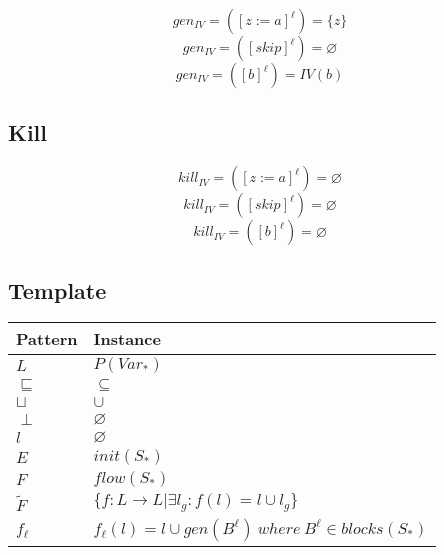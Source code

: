 \documentclass[11pt,a4paper,fleqn]{article}
\begin{document}
   \begin{equation}
      gen_{IV}=([z:=a]^{\ell})=\{z\}
   \end{equation}
   \begin{equation}
      gen_{IV}=([skip]^{\ell})=\varnothing
   \end{equation}
   \begin{equation}
      gen_{IV}=([b]^{\ell})=IV(b)
   \end{equation}

   \subsection{Kill}

   \begin{equation}
      kill_{IV}=([z:=a]^{\ell})=\varnothing
   \end{equation}
   \begin{equation}
      kill_{IV}=([skip]^{\ell})=\varnothing
   \end{equation}
   \begin{equation}
      kill_{IV}=([b]^{\ell})=\varnothing
   \end{equation}

   \subsection{Template}

   \begin{tabularx}{\linewidth}{| l | X |}
      \hline
      \textbf{Pattern} & \textbf{Instance} \\
      \hline\hline
      \( L \)  & \( P(Var_*) \) \\
      \hline
      \( \sqsubseteq \)  & \( \subseteq \) \\
      \hline
      \( \sqcup \)  & \( \cup \) \\
      \hline
      \( \perp \)  & \( \varnothing \) \\
      \hline
      \( l \)  & \( \varnothing \) \\
      \hline
      \( E \)  & \( init(S_*) \) \\
      \hline
      \( F \)  & \( flow(S_*) \) \\
      \hline
      \( \tilde{F} \)  & \( \{f : L \rightarrow L | \exists l_g : f(l) = l \cup l_g \} \) \\
      \hline
      \( f_{\ell} \)  & \( f_{\ell}(l) = l \cup gen(B^{\ell}) \ where \ B^{\ell} \in blocks (S_*) \) \\
      \hline
   \end{tabularx}
\end{document}
